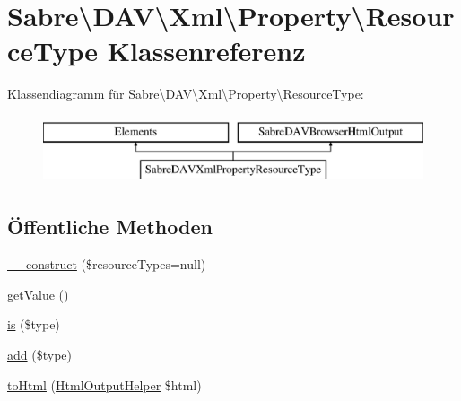\hypertarget{class_sabre_1_1_d_a_v_1_1_xml_1_1_property_1_1_resource_type}{}\section{Sabre\textbackslash{}D\+AV\textbackslash{}Xml\textbackslash{}Property\textbackslash{}Resource\+Type Klassenreferenz}
\label{class_sabre_1_1_d_a_v_1_1_xml_1_1_property_1_1_resource_type}
Klassendiagramm für Sabre\textbackslash{}D\+AV\textbackslash{}Xml\textbackslash{}Property\textbackslash{}Resource\+Type\+:\begin{figure}[H]
\begin{center}
\leavevmode
\includegraphics[height=2.000000cm]{class_sabre_1_1_d_a_v_1_1_xml_1_1_property_1_1_resource_type}
\end{center}
\end{figure}
\subsection*{Öffentliche Methoden}
\begin{DoxyCompactItemize}
\item 
\mbox{\hyperlink{class_sabre_1_1_d_a_v_1_1_xml_1_1_property_1_1_resource_type_acefba16580025c64bac676b7c63d156e}{\+\_\+\+\_\+construct}} (\$resource\+Types=null)
\item 
\mbox{\hyperlink{class_sabre_1_1_d_a_v_1_1_xml_1_1_property_1_1_resource_type_ab056426f26aa3e850ba82274cfcf757e}{get\+Value}} ()
\item 
\mbox{\hyperlink{class_sabre_1_1_d_a_v_1_1_xml_1_1_property_1_1_resource_type_a66cae7ceb677ebd2803455972dfeab35}{is}} (\$type)
\item 
\mbox{\hyperlink{class_sabre_1_1_d_a_v_1_1_xml_1_1_property_1_1_resource_type_a999ff65c2b8075252dd1dd6629fefc6d}{add}} (\$type)
\item 
\mbox{\hyperlink{class_sabre_1_1_d_a_v_1_1_xml_1_1_property_1_1_resource_type_a05091dcffe3fd53144b2ba464b569cfc}{to\+Html}} (\mbox{\hyperlink{class_sabre_1_1_d_a_v_1_1_browser_1_1_html_output_helper}{Html\+Output\+Helper}} \$html)
\end{DoxyCompactItemize}
